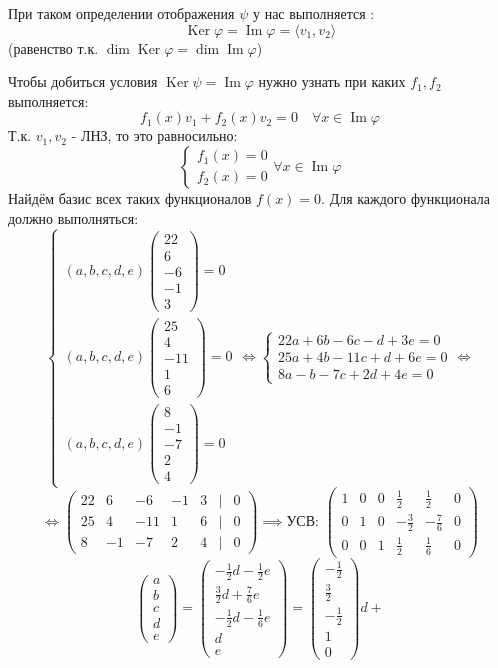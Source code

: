 \documentclass[a4paper]{article}
\newcommand{\mat}[1]{\begin{pmatrix} #1 \end{pmatrix}}
\renewcommand{\f}[2]{\frac{#1}{#2}}
\newcommand{\case}[1]{\begin{cases} #1 \end{cases}}
\newcommand{\Ker}[1]{\operatorname{Ker}}
\renewcommand{\phi}{\varphi}
\newcommand{\lr}{\Leftrightarrow}
\renewcommand{\Ker}{\operatorname{Ker}}
\renewcommand{\Im}{\operatorname{Im}}
\begin{document}
\begin{enumerate}
    При таком определении отображения $\psi$ у нас выполняется :
    $$\Ker \phi = \Im \phi = \langle v_1, v_2\rangle$$
    (равенство т.к. $\dim \Ker \phi = \dim \Im \phi$)

    Чтобы добиться условия $\Ker \psi = \Im \phi$ нужно узнать при каких $f_1, f_2$
    выполняется:
    $$f_1(x)v_1 + f_2(x)v_2 = 0 \quad \forall x \in \Im \phi$$
    Т.к. $v_1, v_2$ - ЛНЗ, то это равносильно:
    $$\case{f_1(x) = 0\\ f_2(x) =0} \forall x \in \Im \phi$$
    Найдём базис всех таких функционалов $f(x) = 0$. 
    Для каждого функционала должно выполняться:
    $$\case{
        (a, b, c, d, e)\mat{22\\6\\-6\\-1\\3} = 0\\
        (a, b, c, d, e)\mat{25\\4\\-11\\1\\6} = 0\\
        (a, b, c, d, e)\mat{8\\-1\\-7\\2\\4}= 0
    }\lr \case{
        22a+6b-6c-d+3e = 0\\ 
        25a+4b-11c+d+6e = 0\\
        8a-b-7c+2d+4e=0
    }\lr$$
    $$\lr \mat{
        22 &6 & -6 & -1 & 3 & | & 0\\
        25 & 4 & -11 & 1 & 6 & | & 0\\
        8 & -1 & -7 & 2 & 4 & | & 0 
    } \implies \text{УСВ: } \mat{1 & 0 & 0 & \frac{1}{2} & \frac{1}{2} & 0 \\
    0 & 1 & 0 & -\frac{3}{2} & -\frac{7}{6} & 0 \\
    0 & 0 & 1 & \frac{1}{2} & \frac{1}{6} & 0}$$
    $$\mat{a\\b\\c\\d\\e} = 
    \mat{-\f{1}{2}d-\f{1}{2}e\\\f{3}{2}d+\f{7}{6}e\\-\f{1}{2}d-\f{1}{6}e\\d\\e} = 
    \mat{-\f{1}{2}\\\f{3}{2}\\-\f{1}{2}\\1\\0}d + 
$$
\end{enumerate}
\end{document}
